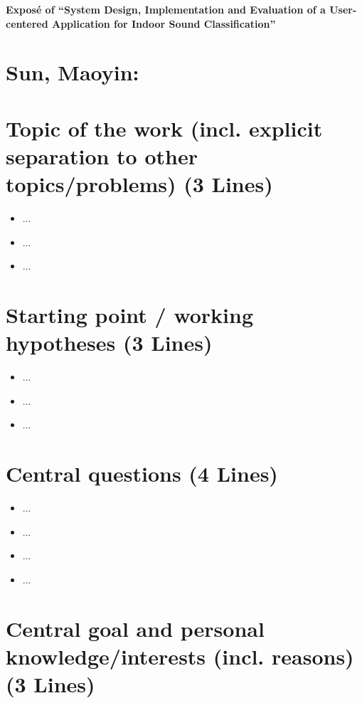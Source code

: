 \documentclass[12pt]{scrartcl}
\begin{document}
\begin{center}
\textbf{\fontsize{16}{16}\selectfont Exposé of ``System Design, Implementation and Evaluation of a User-centered Application for Indoor Sound Classification''}
\end{center}

\bigskip

\section*{Sun, Maoyin:  }



\section*{Topic of the work (incl. explicit separation to other topics/problems) (3 Lines)}


\begin{itemize}
    \item ...
    \item ...
    \item ...
 
\end{itemize}


\section*{Starting point / working hypotheses (3 Lines)}

\begin{itemize}
    \item ...
    \item ...
    \item ...
 
\end{itemize}

\section*{Central questions (4 Lines)}

\begin{itemize}
    \item ...
    \item ...
    \item ...
    \item ...
 
\end{itemize}

\section*{Central goal and personal knowledge/interests (incl. reasons) (3 Lines)}
\end{document}
